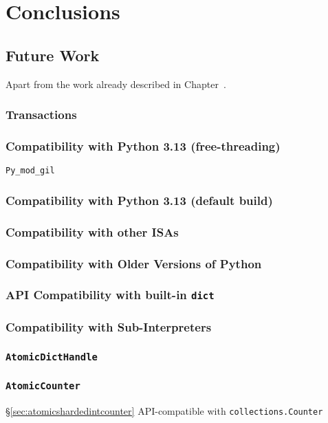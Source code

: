 \chapter{Conclusions}\label{ch:conclusions}

\section{Future Work}\label{sec:future-work}

Apart from the work already described in Chapter~\cite{ch:design-and-implementation}.

\subsection{Transactions}\label{subsec:transactions}

\subsection{Compatibility with Python 3.13 (free-threading)}\label{subsec:compatibility-with-3.13-free-threading}

\texttt{Py\_mod\_gil}

\subsection{Compatibility with Python 3.13 (default build)}\label{subsec:compatibility-with-3.13-default-build}

\subsection{Compatibility with other ISAs}\label{subsec:compatibility-with-other-isas}

\subsection{Compatibility with Older Versions of Python}\label{subsec:compatibility-with-older-versions-of-python}

\subsection{API Compatibility with built-in \texttt{dict}}\label{subsec:api-compatibility-with-dict}

\subsection{Compatibility with Sub-Interpreters}\label{subsec:compatibility-with-sub-interpreters}

\subsection{\texttt{AtomicDictHandle}}\label{subsec:atomicdicthandle}

\subsection{\texttt{AtomicCounter}}\label{subsec:atomiccounter}
\S\ref{sec:atomicshardedintcounter}
API-compatible with \texttt{collections.Counter}
